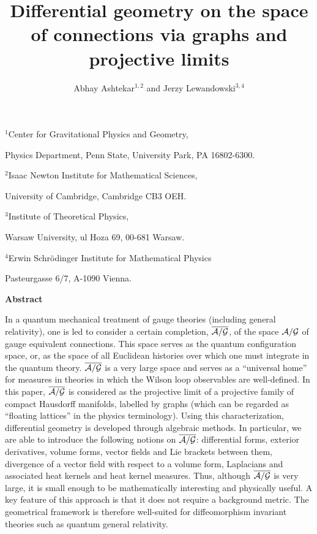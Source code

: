 \baselineskip=20pt

\title{Differential geometry on the space of connections via graphs 
and projective limits}

\author{Abhay Ashtekar${}^{1,2}$ and Jerzy Lewandowski${}^{3,4}$}
%
\maketitle
%
\centerline{${}^{1}$Center for Gravitational Physics and Geometry,}
\centerline{Physics Department, Penn State, University Park,
PA 16802-6300.}

\centerline{${}^{2}$Isaac Newton Institute for Mathematical Sciences,} 
\centerline{University of Cambridge, Cambridge CB3 OEH.}

\centerline{${}^{3}$Institute of Theoretical Physics,}
\centerline{Warsaw University, ul Hoza 69, 00-681 Warsaw.}

\centerline{${}^{4}$Erwin Schr\"odinger Institute for Mathematical Physics}
\centerline{Pasteurgasse 6/7, A-1090 Vienna.}
\bigskip

{\Large{\bf Abstract}}
\bigskip

In a quantum mechanical treatment of gauge theories (including general
relativity), one is led to consider a certain completion, $\overline{{\cal A}/{\cal G}}$, of
the space ${{\cal A}/{\cal G}}$ of gauge equivalent connections.  This space serves as
the quantum configuration space, or, as the space of all Euclidean
histories over which one must integrate in the quantum theory.  $\overline{{\cal A}/{\cal G}}$
is a very large space and serves as a ``universal home'' for measures
in theories in which the Wilson loop observables are well-defined.  In
this paper, $\overline{{\cal A}/{\cal G}}$ is considered as the projective limit of a
projective family of compact Hausdorff manifolds, labelled by graphs
(which can be regarded as ``floating lattices'' in the physics
terminology).  Using this characterization, differential geometry is
developed through algebraic methods.  In particular, we are able to
introduce the following notions on $\overline{{\cal A}/{\cal G}}$: differential forms,
exterior derivatives, volume forms, vector fields and Lie brackets
between them, divergence of a vector field with respect to a volume
form, Laplacians and associated heat kernels and heat kernel measures.
Thus, although $\overline{{\cal A}/{\cal G}}$ is very large, it is small enough to be
mathematically interesting and physically useful. A key feature of
this approach is that it does not require a background metric.  The
geometrical framework is therefore well-suited for diffeomorphism
invariant theories such as quantum general relativity.


